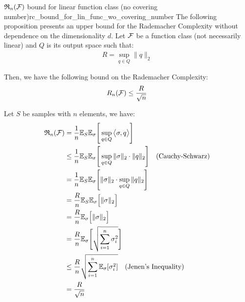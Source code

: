 \begin{proposition}{$\mathfrak{R}_n(\mathcal{F})$ bound for linear function class (no covering number)}{rc_bound_for_lin_func_wo_covering_number}
    The following proposition presents an upper bound for the Rademacher Complexity without dependence on the dimensionality $d$. Let $\mathcal{F}$ be a function class (not necessarily linear) and $Q$ is its output space such that:
    \begin{align*}
        R = \sup_{q\in Q} \|q\|_2
    \end{align*}

    \noindent Then, we have the following bound on the Rademacher Complexity:
    \begin{align*}
        R_n(\mathcal{F}) \le \frac{R}{\sqrt n}
    \end{align*}
\end{proposition}

\begin{proof*}
    Let $S$ be samples with $n$ elements, we have:
    \begin{align*}
        \mathfrak{R}_n(\mathcal{F}) 
            &= \frac{1}{n}\mathbb{E}_S\mathbb{E}_\sigma \Bigg[ 
                \sup_{q\in Q} \big< \sigma, q \big>
             \Bigg] \\
            &\le \frac{1}{n} \mathbb{E}_S\mathbb{E}_\sigma \Bigg[ 
                \sup_{q\in Q} \|\sigma\|_2 \cdot \|q\|_2
             \Bigg] \ \ \ (\text{Cauchy-Schwarz}) \\
            &= \frac{1}{n} \mathbb{E}_S\mathbb{E}_\sigma \Bigg[ 
                \|\sigma\|_2 \cdot \sup_{q\in Q} \|q\|_2
             \Bigg] \\
            &= \frac{R}{n} \mathbb{E}_S\mathbb{E}_\sigma \Big[ \|\sigma\|_2 \Big] \\
            &= \frac{R}{n} \mathbb{E}_\sigma \Big[ \|\sigma\|_2 \Big] \\
            &= \frac{R}{n} \mathbb{E}_\sigma \Bigg[ 
                \sqrt{
                    \sum_{i=1}^n \sigma_i^2
                }
             \Bigg] \\
            &\le \frac{R}{n}\sqrt{
                \sum_{i=1}^n \mathbb{E}_\sigma [\sigma_i^2]
            } \ \ \ (\text{Jenen's Inequality}) \\
            &= \frac{R}{\sqrt n}
    \end{align*}
\end{proof*}



